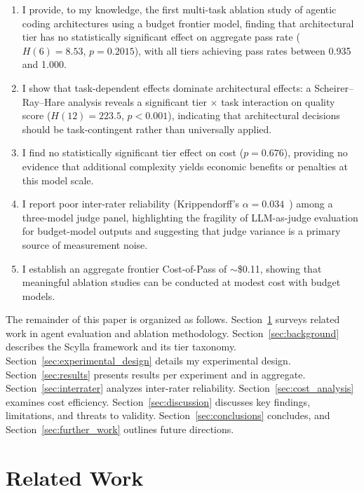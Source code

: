 \documentclass[11pt]{article}
\begin{document}
\begin{enumerate}
  \item I provide, to my knowledge, the first multi-task ablation study of
    agentic coding architectures using a budget frontier model, finding that
    architectural tier has no statistically significant effect on aggregate
    pass rate ($H(6)=8.53$, $p=0.2015$), with all tiers achieving pass rates
    between 0.935 and 1.000.
  \item I show that task-dependent effects dominate architectural effects:
    a Scheirer--Ray--Hare analysis reveals a significant tier $\times$ task
    interaction on quality score ($H(12)=223.5$, $p<0.001$), indicating that
    architectural decisions should be task-contingent rather than universally
    applied.
  \item I find no statistically significant tier effect on cost ($p=0.676$),
    providing no evidence that additional complexity yields economic benefits
    or penalties at this model scale.
  \item I report poor inter-rater reliability (Krippendorff's $\alpha=0.034$~\cite{krippendorff2004content}) among a
    three-model judge panel, highlighting the fragility of LLM-as-judge
    evaluation for budget-model outputs and suggesting that judge variance is
    a primary source of measurement noise.
  \item I establish an aggregate frontier Cost-of-Pass of ${\sim}$\$0.11,
    showing that meaningful ablation studies can be conducted at modest
    cost with budget models.
\end{enumerate}

The remainder of this paper is organized as follows.
Section~\ref{sec:related_work} surveys related work in agent evaluation and
ablation methodology. Section~\ref{sec:background} describes the Scylla
framework and its tier taxonomy. Section~\ref{sec:experimental_design} details
my experimental design. Section~\ref{sec:results} presents results per
experiment and in aggregate. Section~\ref{sec:interrater} analyzes inter-rater
reliability. Section~\ref{sec:cost_analysis} examines cost efficiency.
Section~\ref{sec:discussion} discusses key findings, limitations, and threats
to validity. Section~\ref{sec:conclusions} concludes, and
Section~\ref{sec:further_work} outlines future directions.

\section{Related Work}
\label{sec:related_work}
\end{document}

